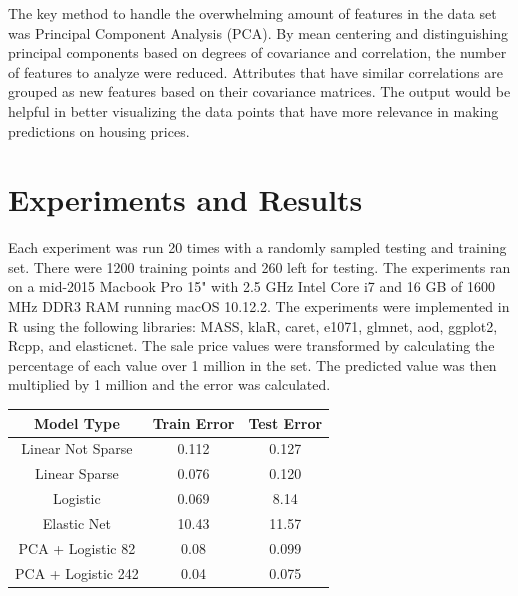 \documentclass[fleqn,10pt]{SelfArx} %
\begin{document}
The key method to handle the overwhelming amount of features in the data set was Principal Component Analysis (PCA).  By mean centering and distinguishing principal components based on degrees of covariance and correlation, the number of features to analyze were reduced.  Attributes that have similar correlations are grouped as new features based on their covariance matrices.  The output would be helpful in better visualizing the data points that have more relevance in making predictions on housing prices.

%

% 

\section{Experiments and Results}
%

% 
% 
% 
% 

Each experiment was run 20 times with a randomly sampled testing and training set. There were 1200 training points and 260 left for testing. The experiments
ran on a mid-2015 Macbook Pro 15" with 2.5 GHz Intel Core i7 and 16 GB of 1600 MHz DDR3 RAM running macOS 10.12.2. The experiments were implemented in R using
the following libraries: MASS, klaR, caret, e1071, glmnet, aod, ggplot2, Rcpp, and elasticnet. The sale price values were transformed by calculating the percentage of
each value over 1 million in the set. The predicted value was then multiplied by 1 million and the error was calculated.


\begin{center}
\begin{tabular}{c|cc}
Model Type &Train Error&Test Error \\\hline\hline
Linear Not Sparse  & 0.112  & 0.127 \\
Linear Sparse   & 0.076  & 0.120 \\
Logistic   & 0.069  & 8.14 \\
Elastic Net   & 10.43  & 11.57 \\
PCA + Logistic 82 &  0.08 & 0.099\\
PCA + Logistic 242 & 0.04 & 0.075 \\ \hline
\end{tabular}
\end{center}
\end{document}
